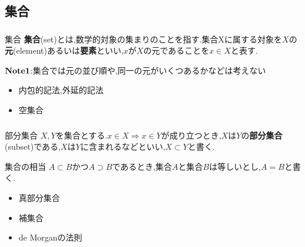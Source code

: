 \documentclass[dvipdfmx,b4j]{jsarticle}
\begin{document}
\subsection{集合}

\subsubsection{}



\begin{definition}{集合}{}
\textbf{集合}(set)とは,数学的対象の集まりのことを指す.集合Xに属する対象を$X$の\textbf{元}(element)あるいは\textbf{要素}といい,$x$が$X$の元であることを$x\in X$と表す.
\end{definition}
\noindent $\bf{Note1}$:集合では元の並び順や,同一の元がいくつあるかなどは考えない
\begin{itemize}
\item 内包的記法,外延的記法
\item 空集合
\end{itemize}

\subsubsection{}
\begin{definition}{部分集合}{}
$X,Y$を集合とする.$x\in X\Longrightarrow x\in Y$が成り立つとき,$X$は$Y$の\textbf{部分集合}(subset)である,$X$は$Y$に含まれるなどといい,$X\subset Y$と書く.
\end{definition}
\begin{definition}{集合の相当}{}
$A\subset B $かつ$A\supset B$であるとき,集合$A$と集合$B$は等しいとし,$A = B $と書く.
\end{definition}
\begin{itemize}
    \item 真部分集合
    \item 補集合
    \item de Morganの法則
\end{itemize}
\end{document}
